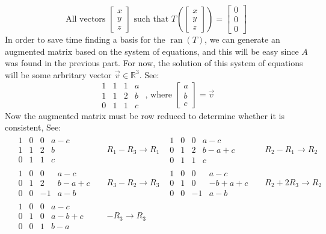 \documentclass{report}
\begin{document}
$$
\text{All vectors } \begin{bmatrix} x \\ y \\ z \end{bmatrix} 
\text{ such that } T\left(\begin{bmatrix} x \\ y \\ z \end{bmatrix}\right) = \begin{bmatrix} 0 \\ 0 \\ 0 \end{bmatrix}
$$ 
In order to save time finding a basis for the $\operatorname{ran}(T)$,  we can generate an augmented matrix based on the system of equations,  and this will be easy since $A$ was found in the previous part.  For now, the solution of this system of equations will be some arbritary vector $\vec{v}\in\mathbb{R}^3$.  See:
$$
\begin{array}{ccc|c}
1 & 1 & 1 & a \\
1 & 1 & 2 & b \\
0 & 1 & 1 & c
\end{array}
\text{ ,  where }
\begin{bmatrix}
a \\ b \\ c
\end{bmatrix} = \vec{v}
$$
Now the augmented matrix must be row reduced to determine whether it is consistent,  See:
\begin{align*}
	&\begin{array}{ccc|c}
		1 & 0 & 0 & a - c \\
		1 & 1 & 2 & b \\
		0 & 1 & 1 & c
	\end{array}
	&& R_1 - R_3 \rightarrow R_1
	&\begin{array}{ccc|c}
		1 & 0 & 0 & a - c \\
		0 & 1 & 2 & b - a + c \\
		0 & 1 & 1 & c
	\end{array}
	&& R_2 - R_1 \rightarrow R_2 \\
	&\begin{array}{ccc|c}
		1 & 0 & 0 & a - c \\
		0 & 1 & 2 & b - a + c \\
		0 & 0 & -1 & a - b
	\end{array}
	&& R_3 - R_2 \rightarrow R_3
	&\begin{array}{ccc|c}
		1 & 0 & 0 & a - c \\
		0 & 1 & 0 & -b + a + c \\
		0 & 0  & -1 & a - b
	\end{array}
	&& R_2 + 2R_3 \rightarrow R_2 \\
	&\begin{array}{ccc|c}
		1 & 0 & 0 & a - c \\
		0 & 1 & 0 & a - b + c \\
		0 & 0 & 1 & b - a
	\end{array}
	&&-R_3 \rightarrow R_3
\end{align*}
\end{document}
